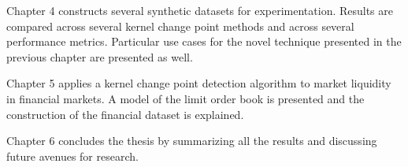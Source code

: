 Chapter 4 constructs several synthetic datasets for experimentation. Results are compared across several kernel change point methods and across several performance metrics. Particular use cases for the novel technique presented in the previous chapter are presented as well.

Chapter 5 applies a kernel change point detection algorithm to market liquidity in financial markets. A model of the limit order book is presented and the construction of the financial dataset is explained.

Chapter 6 concludes the thesis by summarizing all the results and discussing future avenues for research.

%        
    

